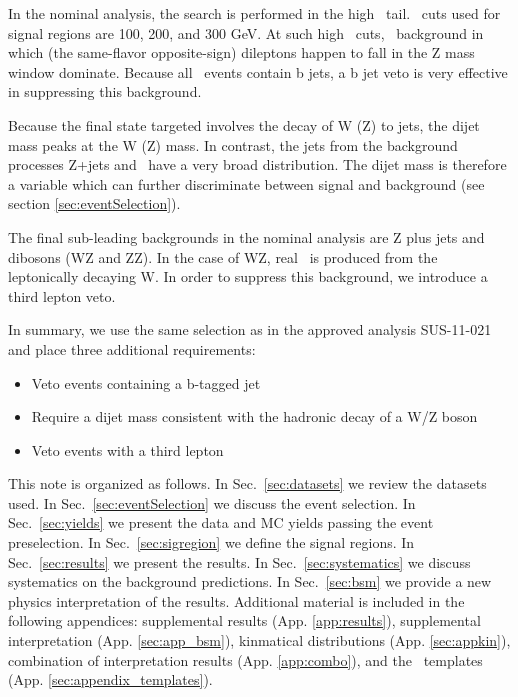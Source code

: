 In the nominal analysis, the search is performed in the high \MET\ tail.
\MET\ cuts used for signal regions are 100, 200, and 300 GeV.
At such high \MET\ cuts, \ttbar\ background in which (the same-flavor 
opposite-sign) dileptons happen to fall in the Z mass window dominate. 
Because all \ttbar\ events contain b jets, a b jet veto is 
very effective in suppressing this background.

Because the final state targeted involves the decay of W (Z) to jets, 
the dijet mass peaks at the W (Z) mass. In contrast, the jets from the
background processes Z+jets and \ttbar\ have a very broad distribution.
The dijet mass is therefore a variable which can further discriminate between 
signal and background (see section \ref{sec:eventSelection}).

The final sub-leading backgrounds in the nominal analysis are Z plus jets 
and dibosons (WZ and ZZ). In the case of WZ, real \MET\ is produced from 
the leptonically decaying W. In order to suppress this background, we 
introduce a third lepton veto.

In summary, we use the same selection as in the approved analysis SUS-11-021 and
place three additional requirements:
\begin{itemize}
\item Veto events containing a b-tagged jet
\item Require a dijet mass consistent with the hadronic decay of a W/Z boson
\item Veto events with a third lepton
\end{itemize}

This note is organized as follows. 
In Sec.~\ref{sec:datasets} we review the datasets used.
In Sec.~\ref{sec:eventSelection} we discuss the event selection.
In Sec.~\ref{sec:yields} we present the data and MC yields passing the event preselection.
In Sec.~\ref{sec:sigregion} we define the signal regions.
In Sec.~\ref{sec:results} we present the results.
In Sec.~\ref{sec:systematics} we discuss systematics on the background predictions.
In Sec.~\ref{sec:bsm} we provide a new physics interpretation of the results.
Additional material is included in the following appendices: 
supplemental results (App. \ref{app:results}),
supplemental interpretation (App. \ref{sec:app_bsm}),
kinmatical distributions (App. \ref{sec:appkin}),
combination of interpretation results (App. \ref{app:combo}),
and the \MET\ templates (App. \ref{sec:appendix_templates}).


